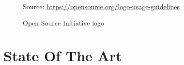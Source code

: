 \begin{figure} %
  \centering
  \def\stackalignment{r} %
  {\scriptsize \parbox[t]{\linewidth}{ Source: \url{https://opensource.org/logo-usage-guidelines}} }
  \caption{Open Source Initiative logo}
\end{figure}

\section{State Of The Art}
\label{sec:introduction_state_of_the_art}


